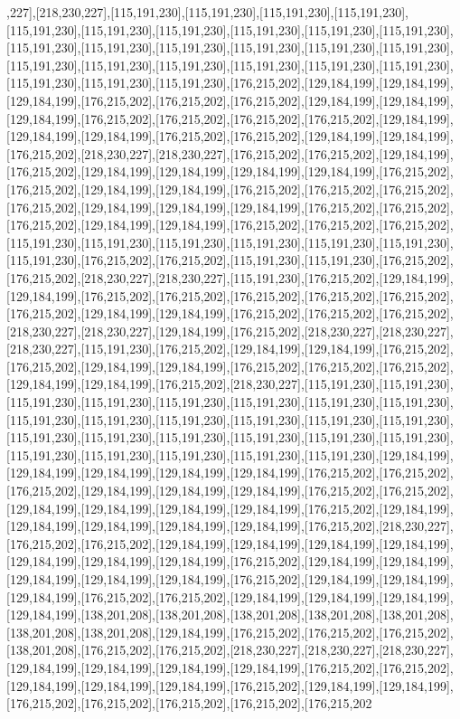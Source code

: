 ,227],[218,230,227],[115,191,230],[115,191,230],[115,191,230],[115,191,230],[115,191,230],[115,191,230],[115,191,230],[115,191,230],[115,191,230],[115,191,230],[115,191,230],[115,191,230],[115,191,230],[115,191,230],[115,191,230],[115,191,230],[115,191,230],[115,191,230],[115,191,230],[115,191,230],[115,191,230],[115,191,230],[115,191,230],[115,191,230],[115,191,230],[176,215,202],[129,184,199],[129,184,199],[129,184,199],[176,215,202],[176,215,202],[176,215,202],[129,184,199],[129,184,199],[129,184,199],[176,215,202],[176,215,202],[176,215,202],[176,215,202],[129,184,199],[129,184,199],[129,184,199],[176,215,202],[176,215,202],[129,184,199],[129,184,199],[176,215,202],[218,230,227],[218,230,227],[176,215,202],[176,215,202],[129,184,199],[176,215,202],[129,184,199],[129,184,199],[129,184,199],[129,184,199],[176,215,202],[176,215,202],[129,184,199],[129,184,199],[176,215,202],[176,215,202],[176,215,202],[176,215,202],[129,184,199],[129,184,199],[129,184,199],[176,215,202],[176,215,202],[176,215,202],[129,184,199],[129,184,199],[176,215,202],[176,215,202],[176,215,202],[115,191,230],[115,191,230],[115,191,230],[115,191,230],[115,191,230],[115,191,230],[115,191,230],[176,215,202],[176,215,202],[115,191,230],[115,191,230],[176,215,202],[176,215,202],[218,230,227],[218,230,227],[115,191,230],[176,215,202],[129,184,199],[129,184,199],[176,215,202],[176,215,202],[176,215,202],[176,215,202],[176,215,202],[176,215,202],[129,184,199],[129,184,199],[176,215,202],[176,215,202],[176,215,202],[218,230,227],[218,230,227],[129,184,199],[176,215,202],[218,230,227],[218,230,227],[218,230,227],[115,191,230],[176,215,202],[129,184,199],[129,184,199],[176,215,202],[176,215,202],[129,184,199],[129,184,199],[176,215,202],[176,215,202],[176,215,202],[129,184,199],[129,184,199],[176,215,202],[218,230,227],[115,191,230],[115,191,230],[115,191,230],[115,191,230],[115,191,230],[115,191,230],[115,191,230],[115,191,230],[115,191,230],[115,191,230],[115,191,230],[115,191,230],[115,191,230],[115,191,230],[115,191,230],[115,191,230],[115,191,230],[115,191,230],[115,191,230],[115,191,230],[115,191,230],[115,191,230],[115,191,230],[115,191,230],[115,191,230],[129,184,199],[129,184,199],[129,184,199],[129,184,199],[129,184,199],[176,215,202],[176,215,202],[176,215,202],[129,184,199],[129,184,199],[129,184,199],[176,215,202],[176,215,202],[129,184,199],[129,184,199],[129,184,199],[129,184,199],[176,215,202],[129,184,199],[129,184,199],[129,184,199],[129,184,199],[129,184,199],[176,215,202],[218,230,227],[176,215,202],[176,215,202],[129,184,199],[129,184,199],[129,184,199],[129,184,199],[129,184,199],[129,184,199],[129,184,199],[176,215,202],[129,184,199],[129,184,199],[129,184,199],[129,184,199],[129,184,199],[176,215,202],[129,184,199],[129,184,199],[129,184,199],[176,215,202],[176,215,202],[129,184,199],[129,184,199],[129,184,199],[129,184,199],[138,201,208],[138,201,208],[138,201,208],[138,201,208],[138,201,208],[138,201,208],[138,201,208],[129,184,199],[176,215,202],[176,215,202],[176,215,202],[138,201,208],[176,215,202],[176,215,202],[218,230,227],[218,230,227],[218,230,227],[129,184,199],[129,184,199],[129,184,199],[129,184,199],[176,215,202],[176,215,202],[129,184,199],[129,184,199],[129,184,199],[176,215,202],[129,184,199],[129,184,199],[176,215,202],[176,215,202],[176,215,202],[176,215,202],[176,215,202
